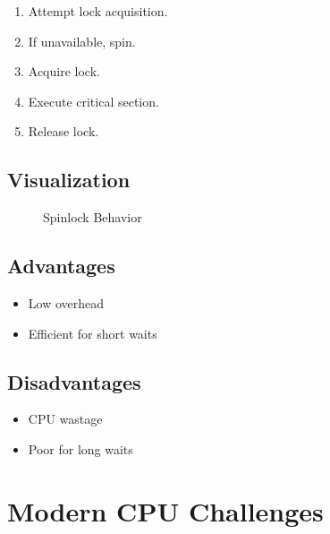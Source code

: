 \begin{enumerate}
\item Attempt lock acquisition.
\item If unavailable, spin.
\item Acquire lock.
\item Execute critical section.
\item Release lock.
\end{enumerate}

\subsection{Visualization}

\begin{figure}[H]
\centering
{}
\caption{Spinlock Behavior}
\end{figure}

\subsection{Advantages}

\begin{itemize}
\item Low overhead
\item Efficient for short waits
\end{itemize}

\subsection{Disadvantages}

\begin{itemize}
\item CPU wastage
\item Poor for long waits
\end{itemize}

\section{Modern CPU Challenges}

